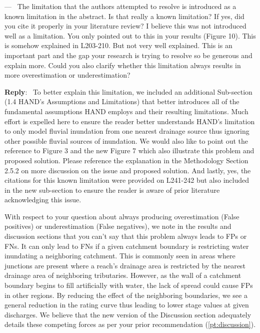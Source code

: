 \documentclass[11pt]{article}
\newcounter{reviewer}
\newcounter{point}[reviewer]
\renewcommand{\thepoint}{P\,\thereviewer.\arabic{point}}
\newenvironment{point}
   {\refstepcounter{point} \bigskip \noindent {\textbf{Reviewer~Point~\thepoint} } ---\ }
   {\par }
\newenvironment{reply}
   {\medskip \noindent \begin{sf}\textbf{Reply}:\  }
   {\medskip \end{sf}}
\begin{document}
\begin{point}
The limitation that the authors attempted to resolve is introduced as a known limitation in the abstract.
Is that really a known limitation?
If yes, did you cite it properly in your literature review?
I believe this was not introduced well as a limitation.
You only pointed out to this in your results (Figure 10).
This is somehow explained in L203-210.
But not very well explained.
This is an important part and the gap your research is trying to resolve so be generous and explain more.
Could you also clarify whether this limitation always results in more overestimation or underestimation? 
\end{point}

\begin{reply}
To better explain this limitation, we included an additional Sub-section (1.4 HAND's Assumptions and Limitations) that better introduces all of the fundamental assumptions HAND employs and their resulting limitations.
Much effort is expelled here to ensure the reader better understands HAND's limitation to only model fluvial inundation from one nearest drainage source thus ignoring other possible fluvial sources of inundation.
We would also like to point out the reference to Figure 3 and the new Figure 7 which also illustrate this problem and proposed solution.
Please reference the explanation in the Methodology Section 2.5.2 on more discussion on the issue and proposed solution.
And lastly, yes, the citations for this known limitation were provided on L241-242 but also included in the new sub-section to ensure the reader is aware of prior literature acknowledging this issue.

With respect to your question about always producing overestimation (False positives) or underestimation (False negatives), we note in the results and discussion sections that you can't say that this problem always leads to FPs or FNs.
It can only lead to FNs if a given catchment boundary is restricting water inundating a neighboring catchment.
This is commonly seen in areas where junctions are present where a reach's drainage area is restricted by the nearest drainage area of neighboring tributaries.
However, as the wall of a catchment boundary begins to fill artificially with water, the lack of spread could cause FPs in other regions.
By reducing the effect of the neighboring boundaries, we see a general reduction in the rating curve thus leading to lower stage values at given discharges.
We believe that the new version of the Discussion section adequately details these competing forces as per your prior recommendation (\ref{pt:discussion}).
\end{reply}
\end{document}
